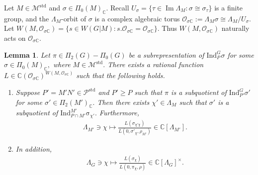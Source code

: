 \documentclass[10pt]{amsart}
\newtheorem{lemma}[theorem]{Lemma}
\theoremstyle{definition}
\numberwithin{equation}{section}
\numberwithin{equation}{subsection}
\newcommand{\Ind}{\mathrm{Ind}}
\newcommand{\CC}{\mathbb{C}}
\renewcommand{\Im}{\mathop{\mathrm{Im}}}
\begin{document}
Let $M\in \mathcal{M}^{\mathrm{std}}$ and $\sigma\in \Pi_0(M)_\CC.$ Recall $U_\sigma=\{\tau\in \Im \Lambda_M: \sigma\cong \sigma_\tau\}$ is a finite group, and the $\Lambda_M$-orbit of $\sigma$ is a complex algebraic torus $\mathcal{O}_{\sigma\CC}:=\Lambda_M\sigma\cong \Lambda_M/U_\sigma.$ Let $W(M,\mathcal{O}_{\sigma\CC})=\{s\in W(G|M):s.\mathcal{O}_{\sigma\CC}=\mathcal{O}_{\sigma\CC}\}.$ Thus $W(M,\mathcal{O}_{\sigma\CC})$ naturally acts on $\mathcal{O}_{\sigma\CC}.$ 

    
\begin{lemma}\label{lem:auxL}
Let $\pi\in \Pi_2(G)-\Pi_0(G)$ be a subrepresentation of $\mathrm{Ind}_{P}^G \sigma$ for some $\sigma\in \Pi_0(M)_\CC,$ where $M\in \mathcal{M}^{\mathrm{std}}.$  There exists a rational function $L\in \CC(\mathcal{O}_{\sigma\CC})^{W(M,\mathcal{O}_{\sigma\CC})}$ such that the following holds.
\begin{enumerate}
        \item Suppose $P'=M'N'\in \mathcal{P}^{\mathrm{std}}$ and $P'\ge P$ such that $\pi$ is a subquotient of $\Ind_{P'}^G \sigma'$ for some $\sigma'\in \Pi_2(M')_\CC.$ Then there exists $\chi'\in \Lambda_M$ such that $\sigma'$ is a subquotient of $\mathrm{Ind}_{P\cap M'}^{M'} \mathrm{\sigma}_{\chi'}.$ Furthermore,  
        \begin{align*}
                \Lambda_{M'}\ni \chi \mapsto \frac{L(\sigma_{\chi'\chi})}{L(0,\sigma'_\chi,\rho_{M'})} \in \CC[\Lambda_{M'}].
        \end{align*}
        \item In addition, 
       \begin{align*}
                \Lambda_{G}\ni \chi \mapsto \frac{L(\sigma_{\chi})}{L(0,\pi_\chi,\rho)} \in \CC[\Lambda_{G}]^\times.
        \end{align*}
\end{enumerate}


\end{lemma}
\end{document}
